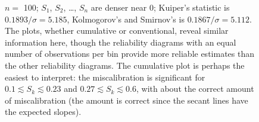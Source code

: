 \documentclass{article}
\begin{document}
\begin{figure}
\begin{centering}
\end{centering}
\caption{$n =$ 100; $S_1$, $S_2$, \dots, $S_n$ are denser near 0;
         Kuiper's statistic is $0.1893 / \sigma = 5.185$,
         Kolmogorov's and Smirnov's is $0.1867 / \sigma = 5.112$.
The plots, whether cumulative or conventional, reveal similar information here,
though the reliability diagrams with an equal number of observations per bin
provide more reliable estimates than the other reliability diagrams.
The cumulative plot is perhaps the easiest to interpret:
the miscalibration is significant for $0.1 \lesssim S_k \lesssim 0.23$
and $0.27 \lesssim S_k \lesssim 0.6$,
with about the correct amount of miscalibration
(the amount is correct since the secant lines have the expected slopes).
}
\label{100_0}
\end{figure}
\end{document}
